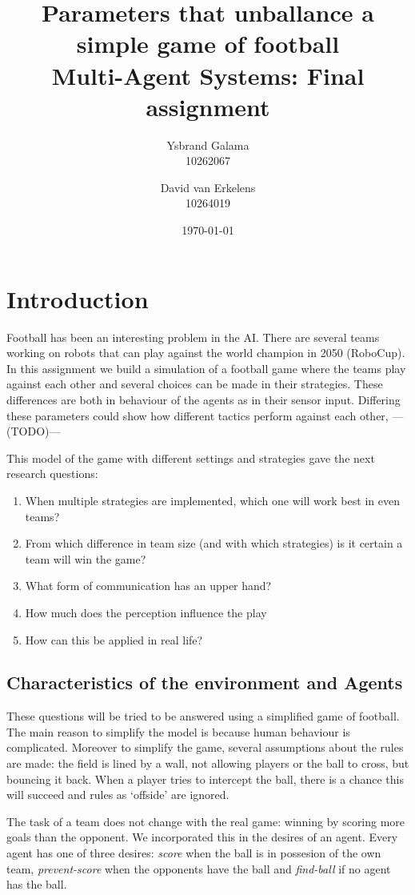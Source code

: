 \documentclass{article}
\title{Parameters that unballance a simple game of football \\ {\Large Multi-Agent Systems: Final assignment} }
\author{Ysbrand Galama \\ 10262067 \and David van Erkelens \\ 10264019}
\date{\today}
\newcommand{\todo}{---(TODO)---\marginnote{TODO} }
\begin{document}
\maketitle

\section{Introduction}
Football has been an interesting problem in the AI. There are several teams working on robots that can play against the world champion in 2050 (RoboCup). In this assignment we build a simulation of a football game where the teams play against each other and several choices can be made in their strategies. These differences are both in behaviour of the agents as in their sensor input. Differing these parameters could show how different tactics perform against each other, \todo

This model of the game with different settings and strategies gave the next research questions:
\begin{enumerate}
    \item When multiple strategies are implemented, which one will work best in even teams?
    \item From which difference in team size (and with which strategies) is it certain a team will win the game?
    \item What form of communication has an upper hand?
    \item How much does the perception influence the play
    \item How can this be applied in real life?
\end{enumerate}

\subsection{Characteristics of the environment and Agents}
These questions will be tried to be answered using a simplified game of football. The main reason to simplify the model is because human behaviour is complicated. Moreover to simplify the game, several assumptions about the rules are made: the field is lined by a wall, not allowing players or the ball to cross, but bouncing it back. When a player tries to intercept the ball, there is a chance this will succeed and rules as `offside' are ignored.

The task of a team does not change with the real game: winning by scoring more goals than the opponent. We incorporated this in the desires of an agent. Every agent has one of three desires: {\em score} when the ball is in possesion of the own team, {\em prevent-score} when the opponents have the ball and {\em find-ball} if no agent has the ball.
\end{document}
